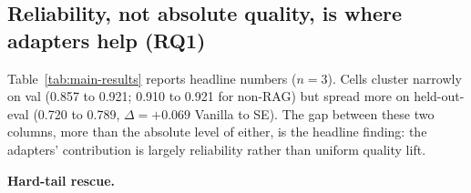 \documentclass{article}
\begin{document}
\subsection{Reliability, not absolute quality, is where adapters help (RQ1)}
\label{subsec:quality}

Table~\ref{tab:main-results} reports headline numbers ($n=3$). Cells cluster narrowly on val (0.857 to 0.921; 0.910 to 0.921 for non-RAG) but spread more on held-out-eval (0.720 to 0.789, $\Delta = +0.069$ Vanilla to SE). The gap between these two columns, more than the absolute level of either, is the headline finding: the adapters' contribution is largely reliability rather than uniform quality lift.

\textbf{Hard-tail rescue.}

\begin{table}[t]
  \caption{Cell-level TreeSim (failures-as-zero) on \texttt{deepseek-v4-flash}, $n=3$ seeds (mean $\pm$ sample std). The left block indicates which grounding components are present in each cell (\textbf{$\bullet$} on, blank off): \emph{Retrieval} (semantic search over GEOS artifacts), \emph{Refine loop} (schema-validating termination hook), \emph{Validator} (the same schema check exposed as an agent-callable tool), and \emph{Memory} (procedural-memory cheatsheet appended to the system prompt). The first eight rows are a Resolution-IV $2^{4-1}$ fractional factorial; \emph{S+X+M} fills the main-effects-best corner missing from the fraction; \emph{SE-prose} substitutes the self-evolved primer and cheatsheet into an otherwise standard \emph{S+X+M} cell; \emph{SE} is the full self-evolved adapter. $\Delta$ = cell mean minus \emph{Vanilla} mean on the same split.}
  \label{tab:main-results}
  \centering
  \small
\end{table}
\end{document}
